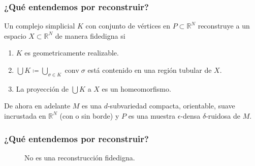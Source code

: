 \documentclass{beamer}
\newcommand{\R}{\mathbb{R}}
\DeclareMathOperator{\conv}{conv}
\begin{document}
\begin{frame}\frametitle{¿Qué entendemos por reconstruir?}
  \begin{Definicion}
    Un complejo simplicial \(K\) con conjunto de vértices en \(P\subset \R^N\)
    reconstruye a un espacio \(X\subset\R^N\) de manera fidedigna si 
    \begin{enumerate}
      \item \(K\) es geometricamente realizable.
      \item \(\bigcup K \coloneqq \bigcup_{\sigma \in K} \conv \sigma\) está contenido en
        una región tubular de \(X\).
      \item La proyección de \(\bigcup K\) a \(X\) es un homeomorfismo.
    \end{enumerate}
  \end{Definicion}
  \pause%
  De ahora en adelante \(M\) es una \(d\)-subvariedad compacta, orientable, suave
  incrustada en \(\R^N\) (con o sin borde) y \(P\) es una muestra \(\epsilon\)-densa
  \(\delta\)-ruidosa de \(M\).
\end{frame}

\begin{frame}\frametitle{¿Qué entendemos por reconstruir?}
  \begin{figure}[H]
    \centering{}
    \caption{No es una reconstrucción fidedigna.}
  \end{figure}
\end{frame}
\end{document}
